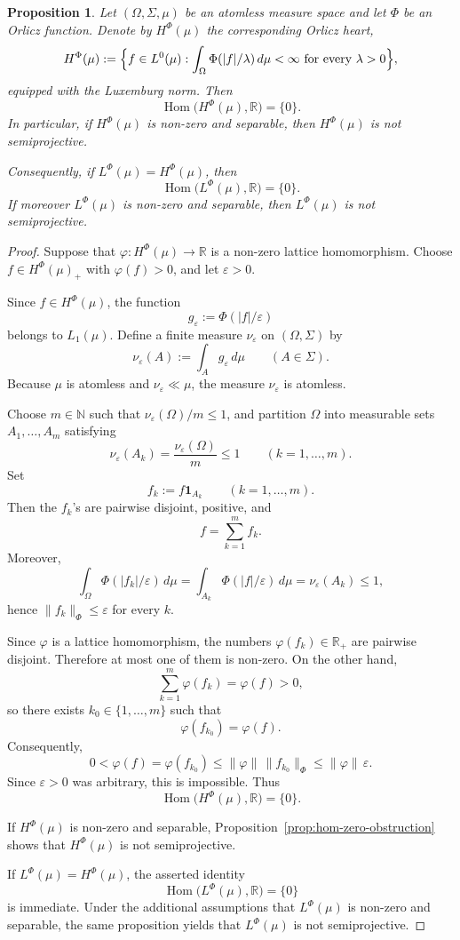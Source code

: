 \documentclass[11pt]{amsart}
\renewcommand{\le}{\leqslant}
\numberwithin{equation}{section}
\newtheorem{proposition}[theorem]{Proposition}
\theoremstyle{definition}
\theoremstyle{remark}
\theoremstyle{plain}
\DeclareMathOperator{\Hom}{Hom}
\begin{document}
\begin{proposition}\label{prop:orlicz-heart-hom-zero}
Let \((\Omega,\Sigma,\mu)\) be an atomless measure space and let \(\Phi\) be an Orlicz
function. Denote by \(H^\Phi(\mu)\) the corresponding Orlicz heart,
\[
H^\Phi(\mu):=
\Bigl\{f\in L^0(\mu): \int_\Omega \Phi(|f|/\lambda)\,d\mu<\infty
\text{ for every }\lambda>0\Bigr\},
\]
equipped with the Luxemburg norm. Then
\[
\Hom\bigl(H^\Phi(\mu),\mathbb R\bigr)=\{0\}.
\]
In particular, if \(H^\Phi(\mu)\) is non-zero and separable, then \(H^\Phi(\mu)\) is not semiprojective.

Consequently, if \(L^\Phi(\mu)=H^\Phi(\mu)\), then
\[
\Hom\bigl(L^\Phi(\mu),\mathbb R\bigr)=\{0\}.
\]
If moreover \(L^\Phi(\mu)\) is non-zero and separable, then \(L^\Phi(\mu)\) is not semiprojective.
\end{proposition}

\begin{proof}
Suppose that \(\varphi\colon H^\Phi(\mu)\to\mathbb R\) is a non-zero lattice homomorphism.
Choose \(f\in H^\Phi(\mu)_+\) with \(\varphi(f)>0\), and let \(\varepsilon>0\).

Since \(f\in H^\Phi(\mu)\), the function
\[
g_\varepsilon:=\Phi(|f|/\varepsilon)
\]
belongs to \(L_1(\mu)\). Define a finite measure \(\nu_\varepsilon\) on \((\Omega,\Sigma)\) by
\[
\nu_\varepsilon(A):=\int_A g_\varepsilon\,d\mu
\qquad (A\in\Sigma).
\]
Because \(\mu\) is atomless and \(\nu_\varepsilon\ll\mu\), the measure \(\nu_\varepsilon\) is atomless.

Choose \(m\in\mathbb N\) such that \(\nu_\varepsilon(\Omega)/m\le 1\), and partition \(\Omega\)
into measurable sets \(A_1,\dots,A_m\) satisfying
\[
\nu_\varepsilon(A_k)=\frac{\nu_\varepsilon(\Omega)}{m}\le 1
\qquad (k=1,\dots,m).
\]
Set
\[
f_k:=f\mathbf 1_{A_k}\qquad (k=1,\dots,m).
\]
Then the \(f_k\)'s are pairwise disjoint, positive, and
\[
f=\sum_{k=1}^m f_k.
\]
Moreover,
\[
\int_\Omega \Phi(|f_k|/\varepsilon)\,d\mu
=\int_{A_k}\Phi(|f|/\varepsilon)\,d\mu
=\nu_\varepsilon(A_k)\le 1,
\]
hence \(\|f_k\|_\Phi\le \varepsilon\) for every \(k\).

Since \(\varphi\) is a lattice homomorphism, the numbers \(\varphi(f_k)\in\mathbb R_+\)
are pairwise disjoint. Therefore at most one of them is non-zero. On the other hand,
\[
\sum_{k=1}^m \varphi(f_k)=\varphi(f)>0,
\]
so there exists \(k_0\in\{1,\dots,m\}\) such that
\[
\varphi(f_{k_0})=\varphi(f).
\]
Consequently,
\[
0<\varphi(f)=\varphi(f_{k_0})
\le \|\varphi\|\,\|f_{k_0}\|_\Phi
\le \|\varphi\|\,\varepsilon.
\]
Since \(\varepsilon>0\) was arbitrary, this is impossible. Thus
\[
\Hom\bigl(H^\Phi(\mu),\mathbb R\bigr)=\{0\}.
\]

If \(H^\Phi(\mu)\) is non-zero and separable, Proposition~\ref{prop:hom-zero-obstruction}
shows that \(H^\Phi(\mu)\) is not semiprojective.

If \(L^\Phi(\mu)=H^\Phi(\mu)\), the asserted identity
\[
\Hom\bigl(L^\Phi(\mu),\mathbb R\bigr)=\{0\}
\]
is immediate. Under the additional assumptions that \(L^\Phi(\mu)\) is non-zero and separable,
the same proposition yields that \(L^\Phi(\mu)\) is not semiprojective.
\end{proof}
\end{document}
